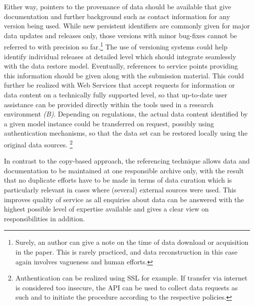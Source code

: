 \documentclass{acm_proc_article-sp}
\begin{document}
Either way, pointers to the provenance of data should be available that give documentation and further background such as contact information for any version being used.
While new persistent identifiers are commonly given for major data updates and releases only, those versions with minor bug-fixes cannot be referred to with precision so far.\footnote{Surely, an author can give a note on the time of data download or acquisition in the paper. This is rarely practiced, and data reconstruction in this case again involves vagueness and human efforts.}
The use of versioning systems could help identify individual releases at detailed level \cite{KoenkerZeileis2009} which should integrate seamlessly with the data restore model.
Eventually, references to service points providing this information should be given along with the submission material.
This could further be realized with Web Services that accept requests for information or data content on a technically fully supported level, so that up-to-date user assistance can be provided directly within the tools used in a research environment \textit{(B)}.
Depending on regulations, the actual data content identified by a given model instance could be transferred on request, possibly using authentication mechanisms, so that the data set can be restored locally using the original data sources.
\footnote{Authentication can be realized using SSL for example. If transfer via internet is considered too insecure, the API can be used to collect data requests as such and to initiate the procedure according to the respective policies.}


In contrast to the copy-based approach, the referencing technique allows data and documentation to be maintained at one responsible archive only, with the result that no duplicate efforts have to be made in terms of data curation which is particularly relevant in cases where (several) external sources were used.
This improves quality of service as all enquiries about data can be answered with the highest possible level of expertise available and gives a clear view on responsibilities in addition.
\end{document}
